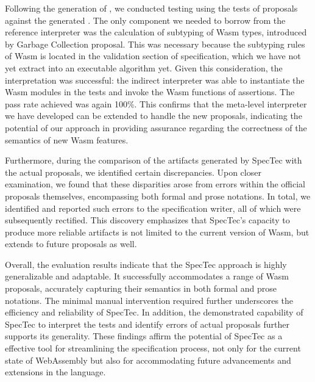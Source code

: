 Following the generation of \al, we conducted testing using the tests of
proposals against the generated \al.  The only component we needed to borrow
from the reference interpreter was the calculation of subtyping of Wasm types,
introduced by Garbage Collection proposal. This was necessary because the
subtyping rules of Wasm is located in the validation section of specification,
which we have not yet extract into an executable algorithm yet.  Given this
consideration, the interpretation was successful: the indirect interpreter was
able to instantiate the Wasm modules in the tests and invoke the Wasm functions
of assertions.  The pass rate achieved was again 100\%.  This confirms that the
meta-level interpreter we have developed can be extended to handle the new
proposals, indicating the potential of our approach in providing assurance
regarding the correctness of the semantics of new Wasm features.

Furthermore, during the comparison of the artifacts generated by SpecTec with
the actual proposals, we identified certain discrepancies. Upon closer
examination, we found that these disparities arose from errors within the
official proposals themselves, encompassing both formal and prose notations. In
total, we identified and reported  such errors to the specification
writer, all of which were subsequently rectified.  This discovery emphasizes
that SpecTec's capacity to produce more reliable artifacts is not limited to
the current version of Wasm, but extends to future proposals as well.

Overall, the evaluation results indicate that the SpecTec approach is highly
generalizable and adaptable. It successfully accommodates a range of Wasm
proposals, accurately capturing their semantics in both formal and prose
notations. The minimal manual intervention required further underscores the
efficiency and reliability of SpecTec.  In addition, the demonstrated
capability of SpecTec to interpret the tests and identify errors of actual
proposals further supports its generality.  These findings affirm the
potential of SpecTec as a effective tool for streamlining the specification
process, not only for the current state of WebAssembly but also for
accommodating future advancements and extensions in the language.

